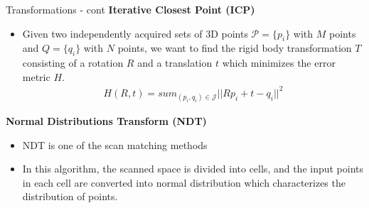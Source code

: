 \documentclass[10pt,mathserif]{beamer}
\begin{document}
\begin{frame}{Transformations - cont}
\textbf{Iterative Closest Point (ICP)}
\begin{itemize}
\item Given two independently acquired sets of 3D points $\mathcal{P} = \{p_i\}$ with $M$ points and
$Q = \{q_i\}$ with $N$ points, we want to find the rigid body transformation $T$ consisting of a rotation $R$ and a translation $t$ which minimizes the error metric $H$.
\begin{align}
H(R,t) = sum_{(p_i,q_i) \in \mathcal{J}} ||Rp_i + t - q_i||^2
\end{align}
\end{itemize}
\textbf{Normal Distributions Transform (NDT)}
\begin{itemize}
\item NDT is one of the scan matching methods 
\item In this algorithm, the scanned space is divided into cells, and the input points in 
each cell are converted into normal distribution which characterizes the distribution of points.
\end{itemize}
\end{frame}

\end{document}

